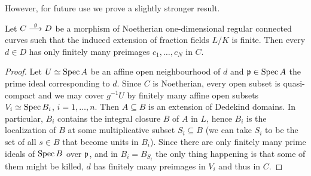 \documentclass[a4paper,parskip=half,numbers=enddot, DIV=12]{scrreprt}
\begin{document}
However, for future use we prove a slightly stronger result.
\begin{lem}
	Let $C\morphism[g] D$ be a morphism of Noetherian one-dimensional regular connected curves such that the induced extension of fraction fields $L/K$ is finite. Then every $d\in D$ has only finitely many preimages $c_1,\ldots,c_N$ in $C$.
\end{lem}
\begin{proof}
	Let $U\simeq \operatorname{Spec} A$ be an affine open neighbourhood of $d$ and $\mathfrak{p}\in\operatorname{Spec} A$ the prime ideal corresponding to $d$. Since $C$ is Noetherian, every open subset is quasi-compact and we may cover $g^{-1}U$ by finitely many affine open subsets $V_i\simeq \operatorname{Spec} B_i$, $i=1,\ldots,n$. Then $A\subseteq B$ is an extension of Dedekind domains. In particular, $B_i$ contains the integral closure $B$ of $A$ in $L$, hence $B_i$ is the localization of $B$ at some multiplicative subset $S_i\subseteq B$ (we can take $S_i$ to be the set of all $s\in B$ that become units in $B_i$). Since there are only finitely many prime ideals of $\operatorname{Spec} B$ over $\mathfrak{p}$, and in $B_i=B_{S_i}$ the only thing happening is that some of them might be killed, $d$ has finitely many preimages in $V_i$ and thus in $C$.
\end{proof}
\end{document}
